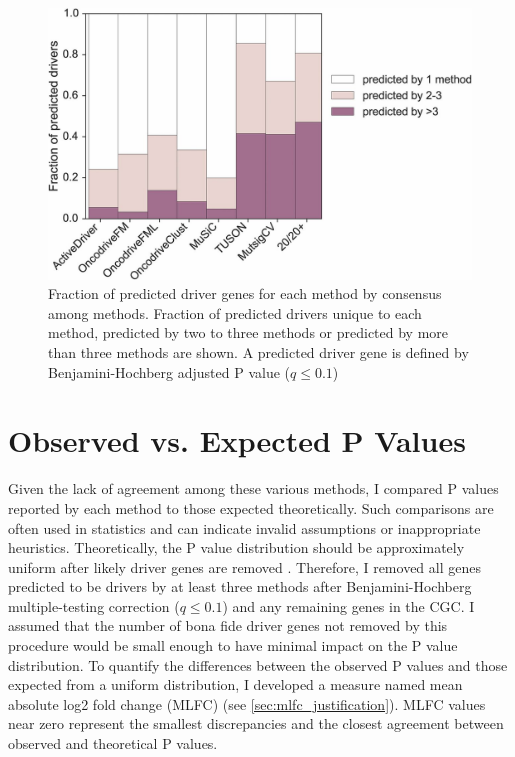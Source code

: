 \begin{figure}
  \centering
  \makeatletter
  \let\@currsize\normalsize
  \includegraphics[width=0.9\linewidth]{figures/chapter4/method_overlap.jpg}
  \caption[Consensus among driver gene methods]{Fraction of predicted driver genes for each method by consensus among methods. Fraction of predicted drivers unique to each method, predicted by two to three methods or predicted by more than three methods are shown. A predicted driver gene is defined by Benjamini-Hochberg adjusted P value ($q \leq 0.1$)}
  \label{fig:benchmark_method_overlap}
\end{figure}

\section{Observed vs. Expected P Values}

Given the lack of agreement among these various methods, I compared P values reported by each method to those expected theoretically. Such comparisons are often used in statistics and can indicate invalid assumptions or inappropriate heuristics. Theoretically, the P value distribution should be approximately uniform after likely driver genes are removed \cite{RN188}. Therefore, I removed all genes predicted to be drivers by at least three methods after Benjamini-Hochberg multiple-testing correction ($q \leq 0.1$) and any remaining genes in the CGC. I assumed that the number of bona fide driver genes not removed by this procedure would be small enough to have minimal impact on the P value distribution. To quantify the differences between the observed P values and those expected from a uniform distribution, I developed a measure named mean absolute log2 fold change (MLFC) (see \autoref{sec:mlfc_justification}). MLFC values near zero represent the smallest discrepancies and the closest agreement between observed and theoretical P values.

